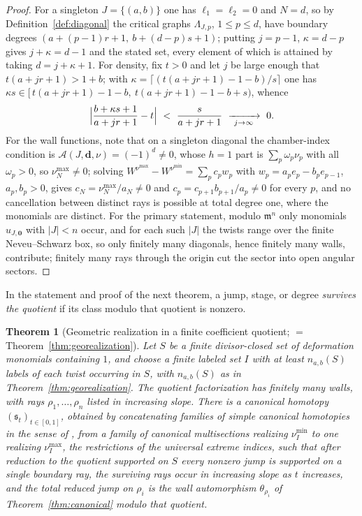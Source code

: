 \documentclass[11pt]{amsart}
\newtheorem{theorem}{Theorem}[section]
\theoremstyle{definition}
\theoremstyle{remark}
\newcommand{\Ascr}{\mathcal{A}}
\begin{document}
\begin{proof}
For a singleton $J=\{(a,b)\}$ one has $\ell_{1}=\ell_{2}=0$ and $N=d$, so by
Definition~\ref{def:diagonal} the critical graphs $\Lambda_{J,p}$, $1\le p\le d$,
have boundary degrees $(a+(p-1)r+1,\ b+(d-p)s+1)$; putting $j=p-1$, $\kappa=d-p$
gives $j+\kappa=d-1$ and the stated set, every element of which is attained by
taking $d=j+\kappa+1$. For density, fix $t>0$ and let $j$ be large enough that
$t(a+jr+1)>1+b$; with $\kappa=\lceil (t(a+jr+1)-1-b)/s\rceil$ one has
$\kappa s\in[\,t(a+jr+1)-1-b,\ t(a+jr+1)-1-b+s)$, whence
\[
\Bigl|\frac{b+\kappa s+1}{a+jr+1}-t\Bigr|\ <\ \frac{s}{a+jr+1}\
\xrightarrow[\ j\to\infty\ ]{}\ 0 .
\]
For the wall functions, note that on a singleton diagonal the chamber-index
condition is $\Ascr(J,\mathbf d,\nu)=(-1)^{d}\ne0$, whose $h=1$ part is
$\sum_{p}\omega_{p}\nu_{p}$ with all $\omega_{p}>0$, so $\nu^{\max}_{N}\ne0$;
solving $W^{\nu^{\max}}-W^{\nu^{\min}}=\sum_{p}c_{p}w_{p}$ with
$w_{p}=a_{p}e_{p}-b_{p}e_{p-1}$, $a_{p},b_{p}>0$, gives
$c_{N}=\nu^{\max}_{N}/a_{N}\ne0$ and $c_{p}=c_{p+1}b_{p+1}/a_{p}\ne0$ for every
$p$, and no cancellation between distinct rays is possible at total degree one,
where the monomials are distinct.
For the primary statement, modulo $\mathfrak m^{n}$ only monomials
$u_{J,\mathbf 0}$ with $|J|<n$ occur, and for each such $|J|$ the twists range
over the finite Neveu--Schwarz box, so only finitely many diagonals, hence
finitely many walls, contribute; finitely many rays through the origin cut the
sector into open angular sectors.
\end{proof}

In the statement and proof of the next theorem, a jump, stage, or degree
\emph{survives the quotient} if its class modulo that quotient is nonzero.

\begin{theorem}[Geometric realization in a finite coefficient quotient;
  $=$ Theorem~\ref{thm:georealization}]
\label{conj:geometric}
Let $S$ be a finite divisor-closed set of deformation monomials containing
$1$, and choose a finite labeled set $I$ with at least $n_{a,b}(S)$ labels of
each twist occurring in $S$, with $n_{a,b}(S)$ as in
Theorem~\ref{thm:georealization}.  The quotient factorization has finitely many
walls, with rays $\rho_1,\dots,\rho_n$ listed in increasing slope.  There is a
canonical homotopy
$(\mathfrak s_{t})_{t\in[0,1]}$, obtained by concatenating families of simple
canonical homotopies in the sense of \cite[\S3.4]{GKT}, from a
family of canonical multisections realizing $\nu_I^{\min}$ to one realizing
$\nu_I^{\max}$, the restrictions of the universal extreme indices, such that
after reduction to the quotient supported on $S$ every nonzero
jump is supported on a single boundary ray, the surviving rays occur
in increasing slope as $t$ increases, and the total reduced jump on $\rho_{i}$
is the wall automorphism $\theta_{\rho_{i}}$ of
Theorem~\ref{thm:canonical} modulo that quotient.
\end{theorem}
\end{document}
